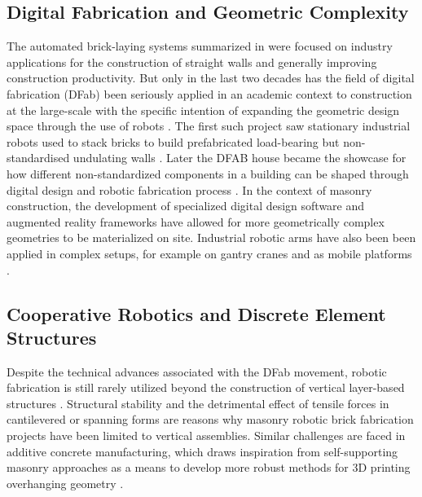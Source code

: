 \subsection{Digital Fabrication and Geometric Complexity}\label{sec:2_dfab} 
The automated brick-laying systems summarized in  were focused on industry applications for the construction of straight walls and generally improving construction productivity. But only in the last two decades has the field of digital fabrication (DFab) been seriously applied in an academic context to construction at the large-scale with the specific intention of expanding the geometric design space through the use of robots \cite{gramazio_digital_2008, gramazio_made_2014}. The first such project saw stationary industrial robots used to stack bricks to build prefabricated load-bearing but non-standardised undulating walls \cite{bonwetsch_informed_2006, bonwetsch_digitally_2007, kohler_gantenbein_2014}. Later the DFAB house \cite{empa_dfab_2021} became the showcase for how different non-standardized components in a building can be shaped through digital design and robotic fabrication process \cite{willmann_robotic_2016, hack_mesh_2017, hack_structural_2020}.  In the context of masonry construction, the development of specialized digital design software \cite{bonwetsch_brickdesign_2012, mele_compas_2017} and augmented reality frameworks \cite{jahn_holographic_2018, jahn_holographic_2019, mitterberger_augmented_2020} have allowed for more geometrically complex geometries to be materialized on site. Industrial robotic arms have also been been applied in complex setups, for example on gantry cranes \cite{piskorec_brick_2018} and as mobile platforms \cite{dorfler_mobile_2016, giftthaler_mobile_2017}.


\subsection{Cooperative Robotics and Discrete Element Structures} \label{sec:lit_discrete}
Despite the technical advances associated with the DFab movement, robotic fabrication is still rarely utilized beyond the construction of vertical layer-based structures \cite{bartschi_wiggled_2010, kohler_programmed_2014}. Structural stability and the detrimental effect of tensile forces in cantilevered or spanning forms are reasons why masonry robotic brick fabrication projects have been limited to vertical assemblies. Similar challenges are faced in additive concrete manufacturing, which draws inspiration from self-supporting masonry approaches as a means to develop more robust methods for 3D printing overhanging geometry \cite{carneau_exploration_2019, carneau_additive_2020, motamedi_supportless_2019}.

